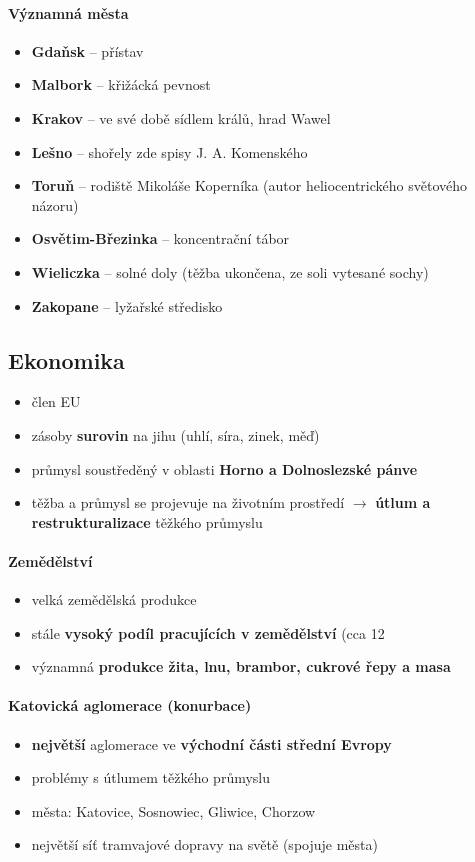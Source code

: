 \paragraph{Významná města}
\begin{itemize}
\item \textbf{Gdaňsk} -- přístav
\item \textbf{Malbork} -- křižácká pevnost
\item \textbf{Krakov} -- ve své době sídlem králů, hrad Wawel
\item \textbf{Lešno} -- shořely zde spisy J. A. Komenského
\item \textbf{Toruň} -- rodiště Mikoláše Koperníka (autor heliocentrického světového názoru)
\item \textbf{Osvětim-Březinka} -- koncentrační tábor
\item \textbf{Wieliczka} -- solné doly (těžba ukončena, ze soli vytesané sochy)
\item \textbf{Zakopane} -- lyžařské středisko
\end{itemize}


\subsection{Ekonomika}
\begin{itemize}
\item člen EU
\item zásoby \textbf{surovin} na jihu (uhlí, síra, zinek, měď)
\item průmysl soustředěný v oblasti \textbf{Horno a Dolnoslezské pánve}
\item těžba a průmysl se projevuje na životním prostředí $\rightarrow$\textbf{ útlum a restrukturalizace} těžkého průmyslu
\end{itemize}

\paragraph{Zemědělství}
\begin{itemize}
\item velká zemědělská produkce
\item stále \textbf{vysoký podíl pracujících v zemědělství} (cca 12%
\item významná \textbf{produkce žita, lnu, brambor, cukrové řepy a masa}
\end{itemize}

\paragraph{Katovická aglomerace (konurbace)}
\begin{itemize}
\item \textbf{největší} aglomerace ve \textbf{východní části střední Evropy}
\item problémy s útlumem těžkého průmyslu
\item města: Katovice, Sosnowiec, Gliwice, Chorzow
\item největší síť tramvajové dopravy na světě (spojuje města)
\end{itemize}



